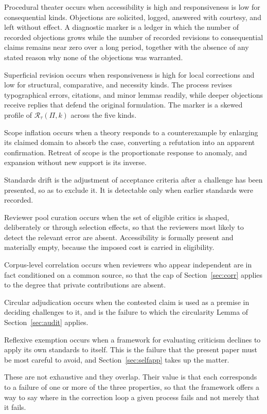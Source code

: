 \documentclass[11pt]{article}
\theoremstyle{remark}
\begin{document}
Procedural theater occurs when accessibility is high and responsiveness is low for consequential kinds. Objections are solicited, logged, answered with courtesy, and left without effect. A diagnostic marker is a ledger in which the number of recorded objections grows while the number of recorded revisions to consequential claims remains near zero over a long period, together with the absence of any stated reason why none of the objections was warranted.

Superficial revision occurs when responsiveness is high for local corrections and low for structural, comparative, and necessity kinds. The process revises typographical errors, citations, and minor lemmas readily, while deeper objections receive replies that defend the original formulation. The marker is a skewed profile of $\mathcal R_\tau(\Pi,k)$ across the five kinds.

Scope inflation occurs when a theory responds to a counterexample by enlarging its claimed domain to absorb the case, converting a refutation into an apparent confirmation. Retreat of scope is the proportionate response to anomaly, and expansion without new support is its inverse.

Standards drift is the adjustment of acceptance criteria after a challenge has been presented, so as to exclude it. It is detectable only when earlier standards were recorded.

Reviewer pool curation occurs when the set of eligible critics is shaped, deliberately or through selection effects, so that the reviewers most likely to detect the relevant error are absent. Accessibility is formally present and materially empty, because the imposed cost is carried in eligibility.

Corpus-level correlation occurs when reviewers who appear independent are in fact conditioned on a common source, so that the cap of Section~\ref{sec:corr} applies to the degree that private contributions are absent.

Circular adjudication occurs when the contested claim is used as a premise in deciding challenges to it, and is the failure to which the circularity Lemma of Section~\ref{sec:audit} applies.

Reflexive exemption occurs when a framework for evaluating criticism declines to apply its own standards to itself. This is the failure that the present paper must be most careful to avoid, and Section~\ref{sec:selfapp} takes up the matter.

These are not exhaustive and they overlap. Their value is that each corresponds to a failure of one or more of the three properties, so that the framework offers a way to say where in the correction loop a given process fails and not merely that it fails.
\end{document}
